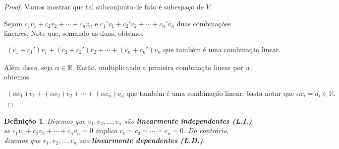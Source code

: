 \documentclass{article}
\newtheorem*{definition}{Definição}
\begin{document}
\begin{proof}
	Vamos mostrar que tal subconjunto de fato é subespaço de $V$. 
	
	\par\vspace{0.3cm} Sejam $c_1v_1 + c_2v_2 + \cdots + c_nv_n$ e $c_1'v_1 + c_2'v_2 + \cdots + c_n'v_n$ duas combinações lineares. Note que, somando as duas, obtemos
	
	\begin{align*}
	(c_1 + c_1')v_1 + (c_2 + c_2')v_2 + \cdots + (c_n + c_n')v_n\text{ que também é uma combinação linear.}
	\end{align*}
	
	\par\vspace{0.3cm}  Além disso, seja $\alpha\in\mathbb{R}$. Então, multiplicando a primeira combinação linear por $\alpha$, obtemos
	
	\begin{align*}
	(\alpha c_1)v_1 + (\alpha c_2)v_2 + \cdots + (\alpha c_n)v_n\text{ que também é uma combinação linear, basta notar que $\alpha c_i = d_i\in\mathbb{R}$.}
	\end{align*}
	
	
\end{proof}

\begin{definition}
	Dizemos que $v_1, v_2, \dots, v_n$ são \textbf{linearmente independentes (L.I.)} se $c_1v_1 + c_2v_2 + \cdots + c_nv_n = 0 $ implica $c_1 = c_2 = \cdots = c_n = 0$. Do contrário, dizemos que $v_1, v_2, \dots, v_n$ são \textbf{linearmente dependentes (L.D.)}.
\end{definition}
\end{document}
